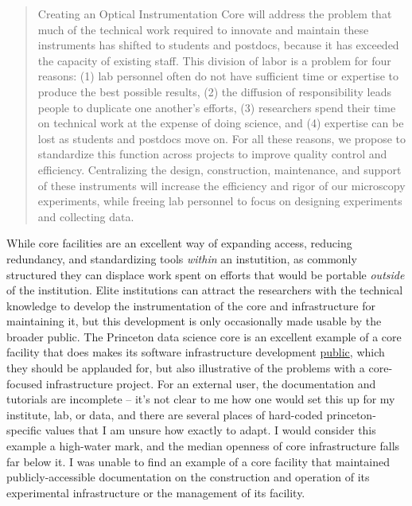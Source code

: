 \begin{quote}
Creating an Optical Instrumentation Core will address the problem that
much of the technical work required to innovate and maintain these
instruments has shifted to students and postdocs, because it has
exceeded the capacity of existing staff. This division of labor is a
problem for four reasons: (1) lab personnel often do not have sufficient
time or expertise to produce the best possible results, (2) the
diffusion of responsibility leads people to duplicate one another's
efforts, (3) researchers spend their time on technical work at the
expense of doing science, and (4) expertise can be lost as students and
postdocs move on. For all these reasons, we propose to standardize this
function across projects to improve quality control and efficiency.
Centralizing the design, construction, maintenance, and support of these
instruments will increase the efficiency and rigor of our microscopy
experiments, while freeing lab personnel to focus on designing
experiments and collecting data.
\end{quote}

While core facilities are an excellent way of expanding access, reducing
redundancy, and standardizing tools \emph{within} an instutition, as
commonly structured they can displace work spent on efforts that would
be portable \emph{outside} of the institution. Elite institutions can
attract the researchers with the technical knowledge to develop the
instrumentation of the core and infrastructure for maintaining it, but
this development is only occasionally made usable by the broader public.
The Princeton data science core is an excellent example of a core
facility that does makes its software infrastructure development
\href{https://github.com/BrainCOGS}{public}, which they should be applauded for, but also
illustrative of the problems with a core-focused infrastructure project.
For an external user, the documentation and tutorials are incomplete --
it's not clear to me how one would set this up for my institute, lab, or
data, and there are several places of hard-coded princeton-specific
values that I am unsure how exactly to adapt. I would
consider this example a high-water mark, and the median openness of core
infrastructure falls far below it. I was unable to find an example of a
core facility that maintained publicly-accessible documentation on the
construction and operation of its experimental infrastructure or the
management of its facility.


